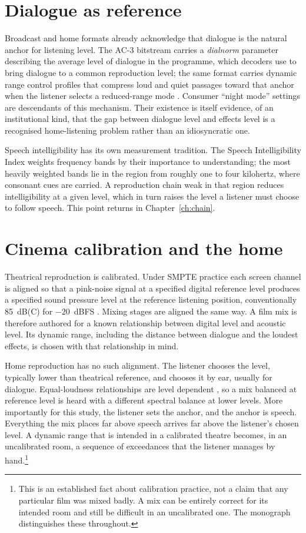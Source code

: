 \section{Dialogue as reference}

Broadcast and home formats already acknowledge that dialogue is the natural anchor for listening level. The AC-3 bitstream carries a \emph{dialnorm} parameter describing the average level of dialogue in the programme, which decoders use to bring dialogue to a common reproduction level; the same format carries dynamic range control profiles that compress loud and quiet passages toward that anchor when the listener selects a reduced-range mode \citep{atsc52}. Consumer ``night mode'' settings are descendants of this mechanism. Their existence is itself evidence, of an institutional kind, that the gap between dialogue level and effects level is a recognised home-listening problem rather than an idiosyncratic one.

Speech intelligibility has its own measurement tradition. The Speech Intelligibility Index \citep{ansi1997} weights frequency bands by their importance to understanding; the most heavily weighted bands lie in the region from roughly one to four kilohertz, where consonant cues are carried. A reproduction chain weak in that region reduces intelligibility at a given level, which in turn raises the level a listener must choose to follow speech. This point returns in Chapter~\ref{ch:chain}.

\section{Cinema calibration and the home}

Theatrical reproduction is calibrated. Under SMPTE practice each screen channel is aligned so that a pink-noise signal at a specified digital reference level produces a specified sound pressure level at the reference listening position, conventionally 85~dB(C) for $-20$~dBFS \citep{smpte200}. Mixing stages are aligned the same way. A film mix is therefore authored for a known relationship between digital level and acoustic level. Its dynamic range, including the distance between dialogue and the loudest effects, is chosen with that relationship in mind.

Home reproduction has no such alignment. The listener chooses the level, typically lower than theatrical reference, and chooses it by ear, usually for dialogue. Equal-loudness relationships are level dependent \citep{fastl2007}, so a mix balanced at reference level is heard with a different spectral balance at lower levels. More importantly for this study, the listener sets the anchor, and the anchor is speech. Everything the mix places far above speech arrives far above the listener's chosen level. A dynamic range that is intended in a calibrated theatre becomes, in an uncalibrated room, a sequence of exceedances that the listener manages by hand.\footnote{This is an established fact about calibration practice, not a claim that any particular film was mixed badly. A mix can be entirely correct for its intended room and still be difficult in an uncalibrated one. The monograph distinguishes these throughout.}


